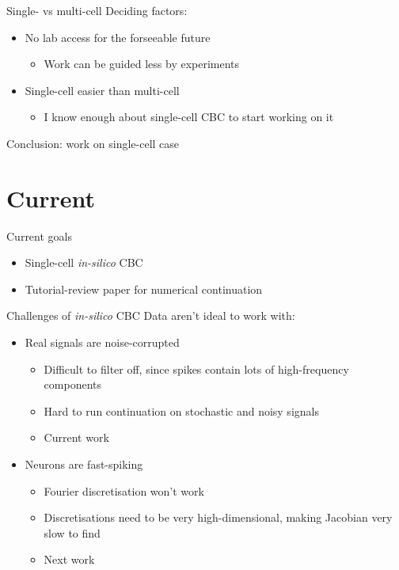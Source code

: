 \documentclass[presentation]{beamer}
\begin{document}
\begin{frame}[label={sec:orgcf8136c}]{Single- vs multi-cell}
Deciding factors:

\vfill

\begin{itemize}
\item No lab access for the forseeable future
\begin{itemize}
\item Work can be guided less by experiments
\end{itemize}
\item Single-cell easier than multi-cell
\begin{itemize}
\item I know enough about single-cell CBC to start working on it
\end{itemize}
\end{itemize}

\vfill

Conclusion: work on single-cell case
\end{frame}


\section{Current}
\label{sec:org6d77b43}
\begin{frame}[label={sec:org17690ff}]{Current goals}
\begin{itemize}
\item Single-cell \emph{in-silico} CBC
\item Tutorial-review paper for numerical continuation
\end{itemize}
\end{frame}

\begin{frame}[label={sec:org67b7d3c}]{Challenges of \emph{in-silico} CBC}
Data aren't ideal to work with:
\vfill
\begin{itemize}
\item Real signals are noise-corrupted
\begin{itemize}
\item Difficult to filter off, since spikes contain lots of high-frequency components
\item Hard to run continuation on stochastic and noisy signals
\item Current work
\end{itemize}
\end{itemize}
\vfill
\begin{itemize}
\item Neurons are fast-spiking
\begin{itemize}
\item Fourier discretisation won't work
\item Discretisations need to be very high-dimensional, making Jacobian very slow to find
\item Next work
\end{itemize}
\end{itemize}

\vfill
\end{frame}
\end{document}
